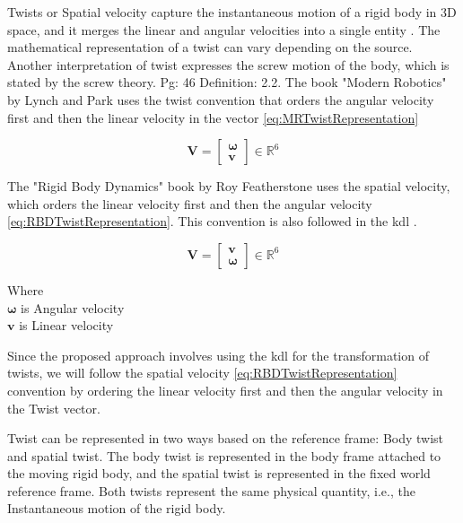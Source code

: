 \documentclass[report.tex]{subfiles}
\begin{document}
    Twists or Spatial velocity capture the instantaneous motion of a rigid body in 3D space, and it merges the linear and angular velocities into a single entity \cite{BOOK-ModernRobotics}. The mathematical representation of a twist can vary depending on the source. Another interpretation of twist expresses the screw motion of the body, which is stated by the screw theory. \cite{BOOK-MathematicalIntroductionToRoboticManipulation} Pg: 46 Definition: 2.2. The book "Modern Robotics" by Lynch and Park \cite{BOOK-ModernRobotics} uses the twist convention that orders the angular velocity first and then the linear velocity in the vector \ref{eq:MRTwistRepresentation}

    \begin{equation}
    \boldsymbol{V} = \begin{bmatrix} \boldsymbol{\omega} \\ \mathbf{v} \end{bmatrix} \in \mathbb{R}^6
    \label{eq:MRTwistRepresentation}
    \end{equation}
        
    The "Rigid Body Dynamics" book \cite{BOOK-RigidBodyDynamicsAlgorithms} by Roy Featherstone uses the spatial velocity, which orders the linear velocity first and then the angular velocity \ref{eq:RBDTwistRepresentation}. This convention is also followed in the \gls{kdl} \cite{REPO-orocos-KDL-github}. 

    \begin{equation}
    \boldsymbol{V} = \begin{bmatrix} \mathbf{v} \\ \boldsymbol{\omega} \end{bmatrix} \in \mathbb{R}^6
    \label{eq:RBDTwistRepresentation}
    \end{equation}

    \begin{flushleft}
        Where \\
        $\boldsymbol{\omega}$ is Angular velocity \\
        $\mathbf{v}$ is Linear velocity
    \end{flushleft}

    Since the proposed approach involves using the \gls{kdl} for the transformation of twists, we will follow the spatial velocity \ref{eq:RBDTwistRepresentation} convention by ordering the linear velocity first and then the angular velocity in the Twist vector. 

    Twist can be represented in two ways based on the reference frame: Body twist and spatial twist. The body twist is represented in the body frame attached to the moving rigid body, and the spatial twist is represented in the fixed world reference frame. Both twists represent the same physical quantity, i.e., the Instantaneous motion of the rigid body. 
\end{document}
